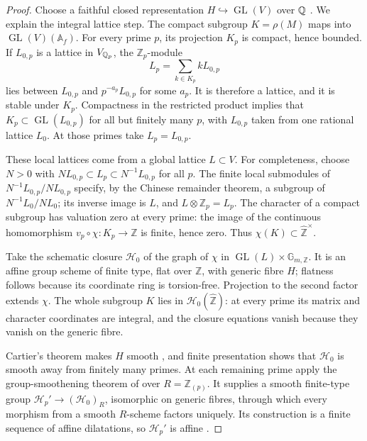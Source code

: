 \begin{proof}
Choose a faithful closed representation $H\hookrightarrow
\operatorname{GL}(V)$ over $\mathbb Q$
\citep[Theorem 4.9 and Corollary 4.10]{D_Milne2022}.
We explain the integral lattice
step. The compact subgroup $K=\rho(M)$ maps into
$\operatorname{GL}(V)(\mathbb A_f)$. For every prime $p$, its
projection $K_p$ is compact, hence bounded. If $L_{0,p}$ is a
lattice in $V_{\mathbb Q_p}$, the $\mathbb Z_p$-module
\[
                  L_p=\sum_{k\in K_p}kL_{0,p}
\]
lies between $L_{0,p}$ and $p^{-a_p}L_{0,p}$ for some $a_p$.
It is therefore a lattice, and it is stable under $K_p$.
Compactness in the restricted product implies that
$K_p\subset\operatorname{GL}(L_{0,p})$ for all but finitely
many $p$, with $L_{0,p}$ taken from one rational lattice $L_0$.
At those primes take $L_p=L_{0,p}$.

These local lattices come from a global lattice
$L\subset V$. For completeness, choose $N>0$ with
$NL_{0,p}\subset L_p\subset N^{-1}L_{0,p}$ for all $p$.
The finite local submodules of
$N^{-1}L_{0,p}/NL_{0,p}$ specify, by the Chinese remainder
theorem, a subgroup of $N^{-1}L_0/NL_0$; its inverse image is
$L$, and $L\otimes\mathbb Z_p=L_p$.
The character of a compact subgroup has valuation zero at every
prime: the image of the continuous homomorphism
$v_p\circ\chi:K_p\to\mathbb Z$ is finite, hence zero.
Thus $\chi(K)\subset\widehat{\mathbb Z}^{\times}$.

Take the schematic closure $\mathscr H_0$ of the graph of
$\chi$ in $\operatorname{GL}(L)\times\mathbb G_{m,\mathbb Z}$.
It is an affine group scheme of finite type, flat over
$\mathbb Z$, with generic fibre $H$; flatness follows because
its coordinate ring is torsion-free. Projection to the second
factor extends $\chi$. The whole subgroup $K$ lies in
$\mathscr H_0(\widehat{\mathbb Z})$: at every prime its
matrix and character coordinates are integral, and the closure
equations vanish because they vanish on the generic fibre.

Cartier's theorem makes $H$ smooth
\citep[Lemma 39.8.2, Tag 047N]{D_StacksCartier}, and finite presentation
shows that $\mathscr H_0$ is smooth away from finitely many
primes. At each remaining prime apply the group-smoothening
theorem of \citet[\S7.1, Theorem 5, p.~175]{DS_BLR1990}
over $R=\mathbb Z_{(p)}$. It supplies a smooth finite-type
group $\mathscr H_p'\to(\mathscr H_0)_R$, isomorphic on
generic fibres, through which every morphism from a smooth
$R$-scheme factors uniquely. Its construction is a finite
sequence of affine dilatations, so $\mathscr H_p'$ is affine
\citep[\S3.2, pp.~62--64; \S7.1, pp.~174--175]{DS_BLR1990}.


\end{proof}
